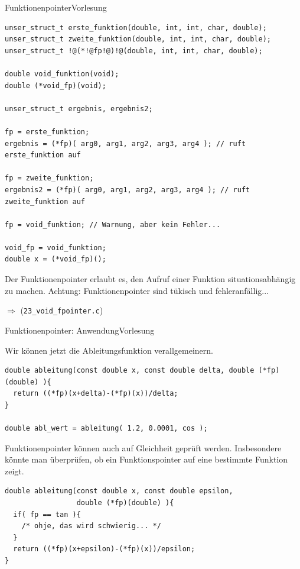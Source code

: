 \documentclass[xcolor=dvipsnames]{beamer}
\newcounter{lecturecounter}
\begin{document}
\begin{frame}[fragile]{Funktionenpointer}{Vorlesung }
\begin{lstlisting}[basicstyle=\ttfamily\scriptsize]
unser_struct_t erste_funktion(double, int, int, char, double);
unser_struct_t zweite_funktion(double, int, int, char, double);
unser_struct_t !@(*!@fp!@)!@(double, int, int, char, double);

double void_funktion(void);
double (*void_fp)(void);

unser_struct_t ergebnis, ergebnis2;

fp = erste_funktion;
ergebnis = (*fp)( arg0, arg1, arg2, arg3, arg4 ); // ruft erste_funktion auf

fp = zweite_funktion;
ergebnis2 = (*fp)( arg0, arg1, arg2, arg3, arg4 ); // ruft zweite_funktion auf

fp = void_funktion; // Warnung, aber kein Fehler...

void_fp = void_funktion;
double x = (*void_fp)();
\end{lstlisting}
\begin{block}{}
  Der Funktionenpointer erlaubt es, den Aufruf einer Funktion situationsabhängig zu machen. Achtung: Funktionenpointer sind tükisch und fehleranfällig...
\end{block}
$\Rightarrow$ (\verb|23_void_fpointer.c|)
\end{frame}

\begin{frame}[fragile]{Funktionenpointer: Anwendung}{Vorlesung }
\begin{block}{}
  Wir können jetzt die Ableitungsfunktion verallgemeinern.
\end{block}
\begin{lstlisting}
double ableitung(const double x, const double delta, double (*fp)(double) ){
  return ((*fp)(x+delta)-(*fp)(x))/delta;
}

double abl_wert = ableitung( 1.2, 0.0001, cos );
\end{lstlisting}
\begin{block}{}
  Funktionenpointer können auch auf Gleichheit geprüft werden. Insbesondere könnte man überprüfen, ob ein Funktionspointer auf eine bestimmte Funktion zeigt.
\end{block}
\begin{lstlisting}
double ableitung(const double x, const double epsilon, 
                 double (*fp)(double) ){
  if( fp == tan ){
    /* ohje, das wird schwierig... */
  }
  return ((*fp)(x+epsilon)-(*fp)(x))/epsilon;
}
\end{lstlisting}
\end{frame}
\end{document}
